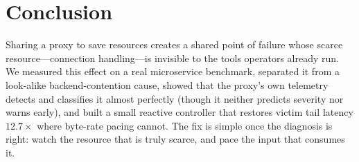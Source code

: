 \documentclass[10pt,twocolumn]{article}
\begin{document}
\section{Conclusion}
Sharing a proxy to save resources creates a shared point of failure whose scarce
resource---connection handling---is invisible to the tools operators already run. We
measured this effect on a real microservice benchmark, separated it from a look-alike
backend-contention cause, showed that the proxy's own telemetry detects and classifies it
almost perfectly (though it neither predicts severity nor warns early), and built a small
reactive controller that restores victim tail latency $12.7\times$ where byte-rate pacing
cannot. The fix is simple once the diagnosis is right: watch the resource that is truly
scarce, and pace the input that consumes it.
\end{document}
